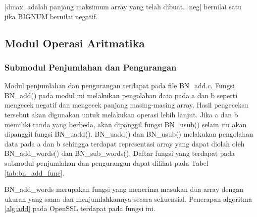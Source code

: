 |dmax| adalah panjang maksimum array yang telah dibuat. |neg| bernilai satu jika BIGNUM bernilai negatif.


\subsection{Modul Operasi Aritmatika}
\subsubsection{Submodul Penjumlahan dan Pengurangan}
Modul penjumlahan dan pengurangan terdapat pada file BN\_add.c. Fungsi BN\_add() pada modul ini melakukan pengolahan data pada a dan b seperti mengecek negatif dan mengecek panjang masing-masing array. Hasil pengecekan tersebut akan digunakan untuk melakukan operasi lebih lanjut. Jika a dan b memiliki tanda yang berbeda, akan dipanggil fungsi BN\_usub() selain itu akan dipanggil fungsi BN\_uadd(). BN\_uadd() dan BN\_usub() melakukan pengolahan data pada a dan b sehingga terdapat representasi array yang dapat diolah oleh BN\_add\_words() dan BN\_sub\_words(). Daftar fungsi yang terdapat pada submodul penjumlahan dan pengurangan dapat dilihat pada Tabel \ref{tab:bn_add_func}.

BN\_add\_words merupakan fungsi yang menerima masukan dua array dengan ukuran yang sama dan menjumlahkannya secara sekuensial. Penerapan algoritma \ref{alg:add} pada OpenSSL terdapat pada fungsi ini.

